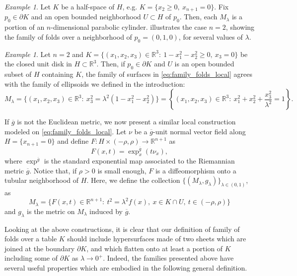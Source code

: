 \documentclass[11pt]{article}
\theoremstyle{definition}
\theoremstyle{remark}
\newtheorem{example}[definition]{Example}
\theoremstyle{plain}
\newcommand{\R}{\mathbb{R}}
\newcommand{\g}{\overline{g}}
\newcommand{\M}{M_\lambda}
\begin{document}
\begin{example}
Let $K$ be a half-space of $H$, e.g. $K = \{x_2\ge 0, \ x_{n+1}=0\}$. Fix $p_0\in \partial K$ and an open bounded neighborhood $U\subset H$ of $p_0$. Then, each $\M$ is a portion of an $n$-dimensional parabolic cylinder.  illustrates the case $n=2$, showing the family of folds over a neighborhood of $p_0 = (0,1,0)$, for several values of $\lambda$.
\end{example}

\begin{example}
Let $n=2$ and $K = \{(x_1,x_2,x_3)\in \R^3:\ 1-x_1^2-x_2^2 \ge 0, \ x_3=0\}$ be the closed unit disk in $H\subset \R^3$. Then, if $p_0\in\partial K$ and $U$ is an open bounded subset of $H$ containing $K$, the family of surfaces in \cref{eq:family_folds_local} agrees with the family of ellipsoids we defined in the introduction:
$$M_\lambda = \Big\{(x_1,x_2,x_3)\in \R^3: \ x_3^2 = \lambda^2(1-x_1^2-x_2^2)\Big\} = \left\{(x_1,x_2,x_3)\in \R^3: \ x_1^2 + x_2^2+ \frac{x_3^2}{\lambda^2} = 1\right\}.$$
\end{example}

If $\g$ is not the Euclidean metric, we now present a similar local construction modeled on \eqref{eq:family_folds_local}. Let $\nu$ be a $\g$-unit normal vector field along $H=\{x_{n+1} = 0\}$ and define $F:H\times (-\rho,\rho)\to \R^{n+1}$ as 
$$F(x,t) = \exp_x^{\g}(t\nu_x),$$
where $\exp^{\g}$ is the standard exponential map associated to the Riemannian metric $\g$. Notice that, if $\rho>0$ is small enough, $F$ is a diffeomorphism onto a tubular neighborhood of $H$. Here, we define the collection $\{(M_\lambda,g_\lambda)\}_{\lambda\in (0,1)}$, as
$$M_\lambda = \{F(x,t)\in \R^{n+1}:\ t^2 = \lambda^2f(x), \ x\in K\cap U,\ t\in (-\rho,\rho)\}$$
and $g_\lambda$ is the metric on $M_\lambda$ induced by $\g$.

Looking at the above constructions, it is clear that our definition of family of folds over a table $K$ should include hypersurfaces made of two sheets which are joined at the boundary $\partial K$, and which flatten onto at least a portion of $K$ including some of $\partial K$ as $\lambda\to 0^+$. Indeed, the families presented above have several useful properties which are embodied in the following general definition.  
\end{document}
